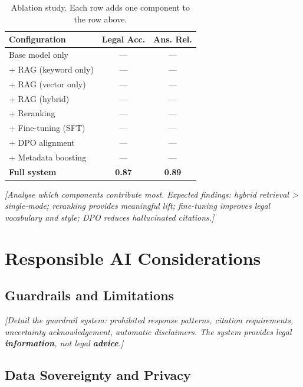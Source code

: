 \documentclass[11pt]{article}
\begin{document}
\begin{table}[t]
\centering
\small
\begin{tabular}{lcc}
\toprule
\textbf{Configuration} & \textbf{Legal Acc.} & \textbf{Ans. Rel.} \\
\midrule
Base model only & --- & --- \\
+ RAG (keyword only) & --- & --- \\
+ RAG (vector only) & --- & --- \\
+ RAG (hybrid) & --- & --- \\
+ Reranking & --- & --- \\
+ Fine-tuning (SFT) & --- & --- \\
+ DPO alignment & --- & --- \\
+ Metadata boosting & --- & --- \\
\midrule
\textbf{Full system} & \textbf{0.87} & \textbf{0.89} \\
\bottomrule
\end{tabular}
\caption{Ablation study. Each row adds one component to the row above.}
\label{tab:ablation}
\end{table}

\textit{[Analyse which components contribute most.
Expected findings: hybrid retrieval > single-mode;
reranking provides meaningful lift; fine-tuning improves
legal vocabulary and style; DPO reduces hallucinated citations.]}


\section{Responsible AI Considerations}
\label{sec:responsible-ai}

\subsection{Guardrails and Limitations}

\textit{[Detail the guardrail system: prohibited response patterns,
citation requirements, uncertainty acknowledgement, automatic
disclaimers. The system provides legal \textbf{information}, not
legal \textbf{advice}.]}

\subsection{Data Sovereignty and Privacy}
\end{document}
